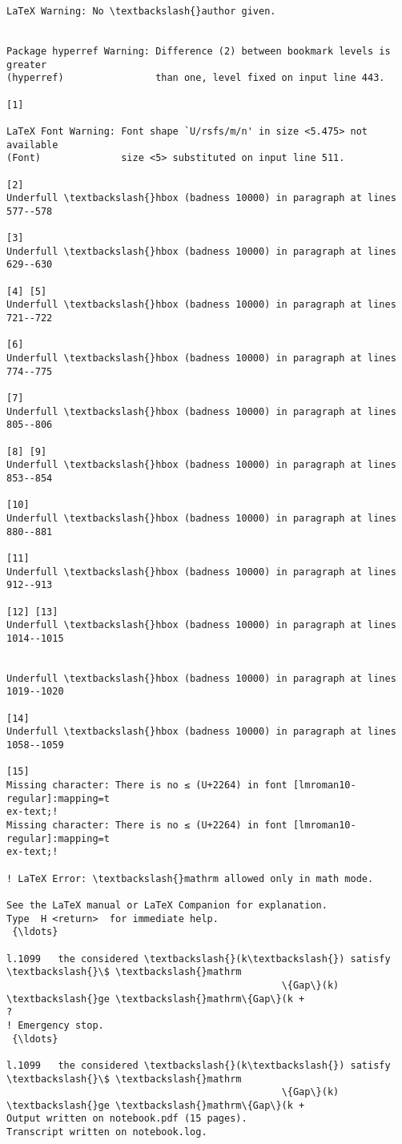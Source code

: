 \documentclass[11pt]{article}
\begin{document}
\begin{Verbatim}[commandchars=\\\{\}]
LaTeX Warning: No \textbackslash{}author given.


Package hyperref Warning: Difference (2) between bookmark levels is greater
(hyperref)                than one, level fixed on input line 443.

[1]

LaTeX Font Warning: Font shape `U/rsfs/m/n' in size <5.475> not available
(Font)              size <5> substituted on input line 511.

[2]
Underfull \textbackslash{}hbox (badness 10000) in paragraph at lines 577--578

[3]
Underfull \textbackslash{}hbox (badness 10000) in paragraph at lines 629--630

[4] [5]
Underfull \textbackslash{}hbox (badness 10000) in paragraph at lines 721--722

[6]
Underfull \textbackslash{}hbox (badness 10000) in paragraph at lines 774--775

[7]
Underfull \textbackslash{}hbox (badness 10000) in paragraph at lines 805--806

[8] [9]
Underfull \textbackslash{}hbox (badness 10000) in paragraph at lines 853--854

[10]
Underfull \textbackslash{}hbox (badness 10000) in paragraph at lines 880--881

[11]
Underfull \textbackslash{}hbox (badness 10000) in paragraph at lines 912--913

[12] [13]
Underfull \textbackslash{}hbox (badness 10000) in paragraph at lines 1014--1015


Underfull \textbackslash{}hbox (badness 10000) in paragraph at lines 1019--1020

[14]
Underfull \textbackslash{}hbox (badness 10000) in paragraph at lines 1058--1059

[15]
Missing character: There is no ≤ (U+2264) in font [lmroman10-regular]:mapping=t
ex-text;!
Missing character: There is no ≤ (U+2264) in font [lmroman10-regular]:mapping=t
ex-text;!

! LaTeX Error: \textbackslash{}mathrm allowed only in math mode.

See the LaTeX manual or LaTeX Companion for explanation.
Type  H <return>  for immediate help.
 {\ldots}

l.1099   the considered \textbackslash{}(k\textbackslash{}) satisfy \textbackslash{}\$ \textbackslash{}mathrm
                                                \{Gap\}(k) \textbackslash{}ge \textbackslash{}mathrm\{Gap\}(k +
?
! Emergency stop.
 {\ldots}

l.1099   the considered \textbackslash{}(k\textbackslash{}) satisfy \textbackslash{}\$ \textbackslash{}mathrm
                                                \{Gap\}(k) \textbackslash{}ge \textbackslash{}mathrm\{Gap\}(k +
Output written on notebook.pdf (15 pages).
Transcript written on notebook.log.

    \end{Verbatim}


    
    
    
\end{document}
